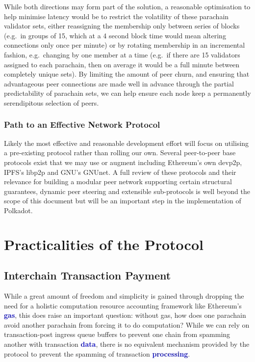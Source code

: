 \documentclass[t,usepdftitle=false]{beamer}
\makeatletter
\newcommand*\eg{e.g.\@\xspace}
\renewcommand{\textit}[1]{\textcolor{blue}{\textbf{#1}}}
\makeatother
\begin{document}
\begin{frame}
While both directions may form part of the solution, a reasonable optimisation to help minimise latency would be to restrict the volatility of these parachain validator sets, either reassigning the membership only between series of blocks (\eg~in groups of 15, which at a 4 second block time would mean altering connections only once per minute) or by rotating membership in an incremental fashion, \eg~changing by one member at a time (\eg~if there are 15 validators assigned to each parachain, then on average it would be a full minute between completely unique sets). By limiting the amount of peer churn, and ensuring that advantageous peer connections are made well in advance through the partial predictability of parachain sets, we can help ensure each node keep a permanently serendipitous selection of peers.

\subsubsection{Path to an Effective Network Protocol}
\label{path-to-an-effective-network-protocol}

Likely the most effective and reasonable development effort will focus on utilising a pre-existing protocol rather than rolling our own. Several peer-to-peer base protocols exist that we may use or augment including Ethereum's own devp2p\cite{devp2p}, IPFS's libp2p\cite{libp2p} and GNU's GNUnet\cite{bennett2002gnunet}. A full review of these protocols and their relevance for building a modular peer network supporting certain structural guarantees, dynamic peer steering and extensible sub-protocols is well beyond the scope of this document but will be an important step in the implementation of Polkadot.

\section{Practicalities of the Protocol}
\label{practicalities-of-the-protocol}

\subsection{Interchain Transaction Payment}

While a great amount of freedom and simplicity is gained through dropping the need for a holistic computation resource accounting framework like Ethereum's \textit{gas}, this does raise an important question: without gas, how does one parachain avoid another parachain from forcing it to do computation? While we can rely on transaction-post ingress queue buffers to prevent one chain from spamming another with transaction \textit{data}, there is no equivalent mechanism provided by the protocol to prevent the spamming of transaction \textit{processing}.


\end{frame}
\end{document}
